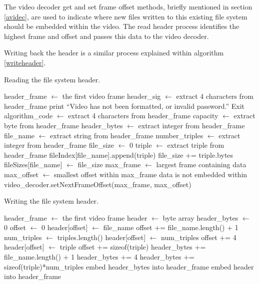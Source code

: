 \documentclass[paper=a4, fontsize=11pt,twoside]{scrartcl}    %
\numberwithin{table}{section}
\numberwithin{figure}{section}
\numberwithin{algorithm}{section}
\begin{document}
The video decoder get and set frame offset methods, briefly mentioned in section \ref{avidec}, are used to indicate where new files written to this existing file system should be embedded within the video. The read header process identifies the highest frame and offset and passes this data to the video decoder.

Writing back the header is a similar process explained within algorithm \ref{writeheader}.

\begin{algorithm}
\caption{Reading the file system header.}
\label{readheader}
\begin{algorithmic}[1]
\State header\_frame $\gets$ the first video frame
\State header\_sig $\gets$ extract 4 characters from header\_frame
	\State print ``Video has not been formatted, or invalid password.''
	\State Exit
\EndIf
\State algorithm\_code $\gets$ extract 4 characters from header\_frame
\State capacity $\gets$ extract byte from header\_frame
\State header\_bytes $\gets$ extract integer from header\_frame
	\State file\_name $\gets$ extract string from header\_frame
	\State number\_triples $\gets$ extract integer from header\_frame
	\State file\_size $\gets$ 0	
		\State triple $\gets$ extract triple from header\_frame
		\State fileIndex[file\_name].append(triple)
		\State file\_size += triple.bytes
	\EndFor
	\State fileSizes[file\_name] $\gets$ file\_size
\EndWhile
\State max\_frame $\gets$ largest frame containing data
\State max\_offset $\gets$ smallest offset within max\_frame data is not embedded within
\State video\_decoder.setNextFrameOffset(max\_frame, max\_offset)
\end{algorithmic}
\end{algorithm}

\begin{algorithm}
\caption{Writing the file system header.}
\label{writeheader}
\begin{algorithmic}[1]
\State header\_frame $\gets$ the first video frame
\State header $\gets$ byte array
\State header\_bytes $\gets$ 0
\State offset $\gets$ 0
	\State header[offset] $\gets$ file\_name
	\State offset += file\_name.length() + 1
	\State num\_triples $\gets$ triples.length()
	\State header[offset] $\gets$ num\_triples
	\State offset += 4
		\State header[offset] $\gets$ triple
		\State offset += sizeof(triple)
	\EndFor
	\State header\_bytes += file\_name.length() + 1
	\State header\_bytes += 4
	\State header\_bytes += sizeof(triple)*num\_triples
\EndFor
\State embed header\_bytes into header\_frame
\State embed header into header\_frame
\end{algorithmic}
\end{algorithm}
\end{document}
